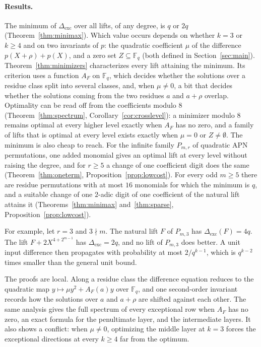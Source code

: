 \documentclass[11pt]{article}
\theoremstyle{definition}
\theoremstyle{remark}
\newcommand{\F}{\mathbb{F}}
\newcommand{\Dexc}{\Delta_{\mathrm{exc}}}
\begin{document}
\paragraph{Results.}
The minimum of $\Dexc$ over all lifts, of any degree, is $q$ or $2q$ (Theorem~\ref{thm:minimax}). Which value occurs
depends on whether $k=3$ or $k\ge4$ and on two invariants of $p$: the quadratic coefficient $\mu$ of the difference
$p(X+\rho)+p(X)$, and a zero set $Z\subseteq\F_q$ (both defined in Section~\ref{sec:main}). Theorem~\ref{thm:minimizers}
characterizes every lift attaining the minimum. Its criterion uses a function $A_F$ on $\F_q$, which decides whether
the solutions over a residue class split into several classes, and, when $\mu\ne0$, a bit that decides whether the
solutions coming from the two residues $a$ and $a+\rho$ overlap. Optimality can be read off from the coefficients modulo
$8$ (Theorem~\ref{thm:spectrum}, Corollary~\ref{cor:crosslevel}): a minimizer modulo $8$ remains optimal at every higher
level exactly when $A_F$ has no zero, and a family of lifts that is optimal at every level exists exactly when $\mu=0$ or
$Z\ne\emptyset$. The minimum is also cheap to reach. For the infinite family $P_{m,r}$ of quadratic APN permutations, one
added monomial gives an optimal lift at every level without raising the degree, and for $r\ge5$ a change of one
coefficient digit does the same (Theorem~\ref{thm:oneterm}, Proposition~\ref{prop:lowcost}). For every odd $m\ge5$ there
are residue permutations with at most $16$ monomials for which the minimum is $q$, and a suitable change of one $2$-adic
digit of one coefficient of the natural lift attains it (Theorems~\ref{thm:minimax} and~\ref{thm:sparse},
Proposition~\ref{prop:lowcost}).

For example, let $r=3$ and $3\nmid m$. The natural lift $F$ of $P_{m,3}$ has $\Dexc(F)=4q$. The lift
$F+2X^{4+2^{m-1}}$ has $\Dexc=2q$, and no lift of $P_{m,3}$ does better. A unit input difference then propagates with
probability at most $2/q^{k-1}$, which is $q^{k-2}$ times smaller than the general unit bound.

The proofs are local. Along a residue class the difference equation reduces to the quadratic map
$y\mapsto\mu y^2+A_F(a)y$ over $\F_q$, and one second-order invariant records how the solutions over $a$ and $a+\rho$
are shifted against each other. The same analysis gives the full spectrum of every exceptional row when $A_F$ has no
zero, an exact formula for the penultimate layer, and the intermediate layers. It also shows a conflict: when $\mu\ne0$,
optimizing the middle layer at $k=3$ forces the exceptional directions at every $k\ge4$ far from the optimum.
\end{document}
